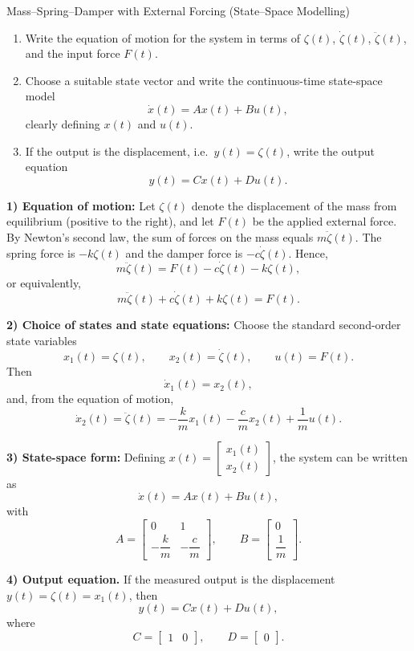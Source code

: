\begin{examplebox}{Mass--Spring--Damper with External Forcing (State--Space Modelling)}
	\medskip
	\begin{enumerate}
		\item Write the equation of motion for the system in terms of $\zeta(t)$, $\dot{\zeta}(t)$, $\ddot{\zeta}(t)$, and the input force $F(t)$.
		\item Choose a suitable state vector and write the continuous-time state-space model
		\[
		\dot{x}(t) = A x(t) + B u(t),
		\]
		clearly defining $x(t)$ and $u(t)$.
		\item If the output is the displacement, i.e.\ $y(t)=\zeta(t)$, write the output equation
		\[
		y(t) = C x(t) + D u(t).
		\]
	\end{enumerate}
	\medskip
	\solution
	\textbf{1) Equation of motion:}
	Let $\zeta(t)$ denote the displacement of the mass from equilibrium (positive to the right), and let $F(t)$ be the applied external force. By Newton’s second law, the sum of forces on the mass equals $m\ddot{\zeta}(t)$. The spring force is $-k\zeta(t)$ and the damper force is $-c\dot{\zeta}(t)$. Hence,
	\[
	m\ddot{\zeta}(t) = F(t) - c\dot{\zeta}(t) - k\zeta(t),
	\]
	or equivalently,
	\[
	m\ddot{\zeta}(t) + c\dot{\zeta}(t) + k\zeta(t) = F(t).
	\]
	
	\medskip
	\textbf{2) Choice of states and state equations:}
	Choose the standard second-order state variables
	\[
	x_1(t)=\zeta(t), 
	\qquad 
	x_2(t)=\dot{\zeta}(t),
	\qquad 
	u(t)=F(t).
	\]
	Then
	\[
	\dot{x}_1(t) = x_2(t),
	\]
	and, from the equation of motion,
	\[
	\dot{x}_2(t)=\ddot{\zeta}(t) = -\frac{k}{m}x_1(t) - \frac{c}{m}x_2(t) + \frac{1}{m}u(t).
	\]
	
	\medskip
	\textbf{3) State-space form:}
	Defining $x(t)=\begin{bmatrix}x_1(t)\\x_2(t)\end{bmatrix}$, the system can be written as
	\[
	\dot{x}(t)=A x(t)+B u(t),
	\]
	with
	\[
	A=
	\begin{bmatrix}
		0 & 1\\[4pt]
		-\dfrac{k}{m} & -\dfrac{c}{m}
	\end{bmatrix},
	\qquad
	B=
	\begin{bmatrix}
		0\\[4pt]
		\dfrac{1}{m}
	\end{bmatrix}.
	\]
	
	\medskip
	\textbf{4) Output equation.}
	If the measured output is the displacement $y(t)=\zeta(t)=x_1(t)$, then
	\[
	y(t)=C x(t)+D u(t),
	\]
	where
	\[
	C=\begin{bmatrix}1 & 0\end{bmatrix},
	\qquad
	D=\begin{bmatrix}0\end{bmatrix}.
	\]
	
\end{examplebox}

